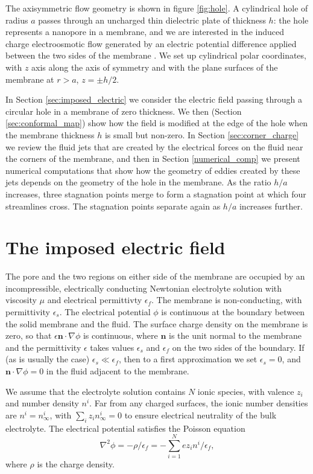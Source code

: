 The axisymmetric flow geometry is shown in figure \ref{fig:hole}.
A cylindrical
hole of radius $a$ passes through an uncharged thin dielectric
plate of thickness $h$:
the hole represents a nanopore in a membrane, and we are interested in the
induced charge electroosmotic
flow generated by an electric potential difference applied 
between the two sides of the membrane \cite{Mao2013,mao2014,sherwood2014}.
We set up cylindrical polar coordinates, with $z$ axis along the axis of
symmetry and with the plane surfaces of the membrane at $r>a$,  $z=\pm h/2$.

In Section \ref{sec:imposed_electric} we consider the electric field passing through a circular hole in
a membrane of zero thickness. We then (Section \ref{sec:conformal_map})
show how the field is modified at
the edge of the hole when the membrane thickness $h$ is small but non-zero.
In Section \ref{sec:corner_charge}
we review the fluid jets that are created by the electrical
forces on 
the
fluid near the
corners of the membrane, and then in Section \ref{numerical_comp} we present 
numerical computations that show how the geometry of
eddies created by these jets depends on the geometry of the hole in
the membrane. As the ratio $h/a$ increases, three
stagnation points merge to form
a stagnation point at which four streamlines cross. The
stagnation points separate again
as $h/a$ increases further.

\section{The imposed electric field\label{sec:imposed_electric}}

The pore
and the two regions on either side of the membrane are occupied by
an incompressible, electrically conducting
Newtonian electrolyte solution
with viscosity $\mu$ and electrical permittivty
$\epsilon_f$. The membrane is non-conducting, with permittivity $\epsilon_s$.
The electrical potential $\phi$ is continuous at the boundary
between the solid membrane and the fluid.
The surface charge density
on the membrane is zero, so that
$\epsilon\mathbf n\cdot\nabla\phi$ is continuous,
where $\mathbf n$ is the unit normal to the membrane
and the permittivity $\epsilon$ takes values $\epsilon_s$ and
$\epsilon_f$ on the two sides of the boundary. If (as is usually
the case) $\epsilon_s\ll\epsilon_f$, then to a first approximation
we set $\epsilon_s=0$, and
$\mathbf n\cdot\nabla\phi=0$ in the fluid adjacent to the membrane.

We assume that the electrolyte solution
contains $N$ ionic species,
with valence $z_i$ and number density $n^i$.
Far from any charged surfaces, the ionic
number densities are $n^i=n^i_\infty$, with $\sum_i z_in_\infty^i=0$
to ensure electrical neutrality of the bulk electrolyte.
The electrical potential satisfies the Poisson equation
\begin{equation}
\nabla^2\phi=-\rho/\epsilon_f=-\sum_{i=1}^Nez_in^i/\epsilon_f,
\label{poisson}
\end{equation}
where $\rho$ is the charge density.

